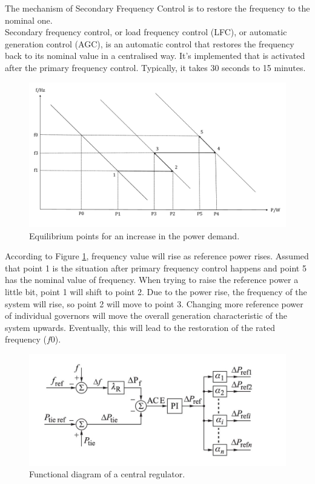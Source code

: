 \documentclass{report}
\begin{document}
The mechanism of Secondary Frequency Control is to restore the frequency to the nominal one.\\

Secondary frequency control, or load frequency control (LFC), or automatic generation control (AGC), is an automatic control that restores the frequency back to its nominal value in a centralised way. It's implemented that is activated after the primary frequency control. Typically, it takes 30 seconds to 15 minutes.\\

\begin{figure}[htbp]
\centering
\includegraphics[width = \textwidth]{figure/3_1_Equilibrium.pdf}
\caption{Equilibrium points for an increase in the power demand.}
\label{3_1_Equilibrium}
\end{figure}

According to Figure \textcolor{red}{\ref{3_1_Equilibrium}}, frequency value will rise as reference power rises. Assumed that point 1 is the situation after primary frequency control happens and point 5 has the nominal value of frequency. When trying to raise the reference power a little bit, point 1 will shift to point 2. Due to the power rise, the frequency of the system will rise, so point 2 will move to point 3. Changing more reference power of individual governors will move the overall generation characteristic of the system upwards. Eventually, this will lead to the restoration of the rated frequency ($f0$).\\

\begin{figure}[htb]
\centering
\includegraphics[width = \textwidth]{figure/3_1_Functional.png}
\caption{Functional diagram of a central regulator.}
\label{3_1_Functional}
\end{figure}
\end{document}
